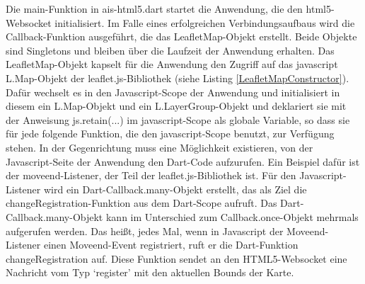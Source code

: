 Die main-Funktion in ais-html5.dart startet die Anwendung, die den html5-Websocket initialisiert. Im Falle eines erfolgreichen Verbindungsaufbaus wird die Callback-Funktion ausgeführt, die das LeafletMap-Objekt erstellt. Beide Objekte sind Singletons und bleiben über die Laufzeit der Anwendung erhalten.
Das LeafletMap-Objekt kapselt für die Anwendung den Zugriff auf das javascript L.Map-Objekt der leaflet.js-Bibliothek (siehe Listing \ref{LeafletMapConstructor}). Dafür wechselt es in den Javascript-Scope der Anwendung und initialisiert in diesem ein L.Map-Objekt und ein L.LayerGroup-Objekt und deklariert sie mit der Anweisung js.retain(...) im javascript-Scope als globale Variable, so dass sie für jede folgende Funktion, die den javascript-Scope benutzt, zur Verfügung stehen.
In der Gegenrichtung muss eine Möglichkeit existieren, von der Javascript-Seite der Anwendung den Dart-Code aufzurufen. Ein Beispiel dafür ist der moveend-Listener, der Teil der leaflet.js-Bibliothek ist. Für den Javascript-Listener wird ein Dart-Callback.many-Objekt erstellt, das als Ziel die changeRegistration-Funktion aus dem Dart-Scope aufruft. Das Dart-Callback.many-Objekt kann im Unterschied zum Callback.once-Objekt mehrmals aufgerufen werden. Das heißt, jedes Mal, wenn in Javascript der Moveend-Listener einen Moveend-Event registriert, ruft er die Dart-Funktion changeRegistration auf. Diese Funktion sendet an den HTML5-Websocket eine Nachricht vom Typ ‘register’ mit den aktuellen Bounds der Karte.


